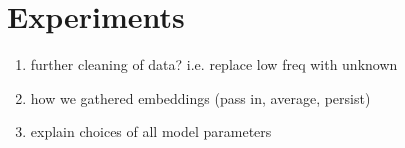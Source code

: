 \section{Experiments}
\label{sec: exp}

\begin{enumerate}
\item further cleaning of data? i.e. replace low freq with unknown
\item how we gathered embeddings (pass in, average, persist)
\item explain choices of all model parameters
\end{enumerate}

